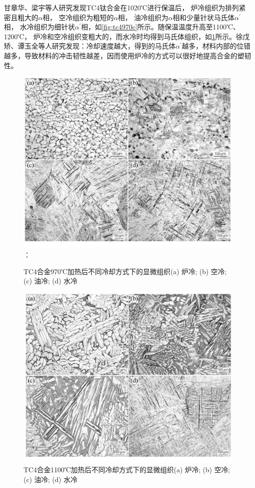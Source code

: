 \documentclass[
class = book,
zihao = -4,
font = noto,
paper = a4paper,
openany
]{easybook}
\begin{document}
甘章华、梁宇等人研究发现\cite{ganzhanghuaRechuligongyiduiTC4taihejinzuzhijiyingdudeyingxiang2014}TC4钛合金在1020℃进行保温后， 炉冷组织为排列紧密且粗大的$\alpha $相， 空冷组织为粗短的$\alpha $相， 油冷组织为$\alpha $相和少量针状马氏体$\alpha^{\prime}$相， 水冷组织为细针状$\alpha^{\prime}$相，如\ref{fig:tc4970c}所示。随保温温度升高至1100℃、1200℃， 炉冷和空冷组织变粗大的，而水冷时均得到马氏体组织，如\ref{fig:tc41100c}所示。徐戊矫、谭玉全等人研究\cite{xuwujiaoTuihuowenduhelengquesushuaiduiTC4taihejinzuzhihexingnengdeyingxiang2016}发现：冷却速度越大，得到的马氏体$ \alpha^{\prime} $越多，材料内部的位错越多，导致材料的冲击韧性越差，因而使用炉冷的方式可以很好地提高合金的塑韧性。
\begin{figure}[htbp]
	\centering
	\begin{minipage}[t]{0.48\textwidth}
	\centering
	\includegraphics[width=0.7\linewidth]{TC4合金970℃加热后不同冷却方式下的显微组织}：
\caption{TC4合金970℃加热后不同冷却方式下的显微组织\cite{ganzhanghuaRechuligongyiduiTC4taihejinzuzhijiyingdudeyingxiang2014}(a) 炉冷; (b) 空冷; (c) 油冷; (d) 水冷}
\label{fig:tc4970c}
	\end{minipage}
	\begin{minipage}[t]{0.48\textwidth}
	\centering
\includegraphics[width=0.7\linewidth]{TC4合金1100℃加热后不同冷却方式下的显微组织}
\caption{TC4合金1100℃加热后不同冷却方式下的显微组织(a) 炉冷; (b) 空冷; (c) 油冷; (d) 水冷}
\label{fig:tc41100c}
	\end{minipage}
\end{figure}
\end{document}
